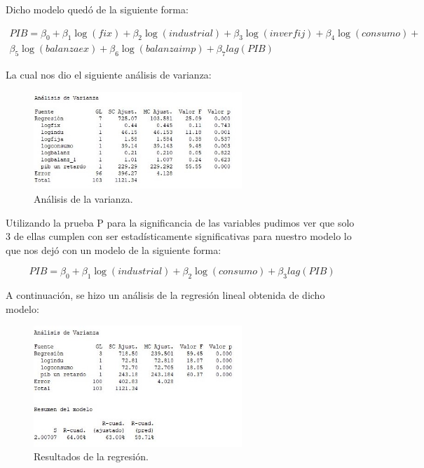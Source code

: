 \documentclass[a4paper]{article}
\begin{document}
Dicho modelo quedó de la siguiente forma:

\begin{eqnarray}
PIB = \beta_0 + \beta_1 \log(fix) + \beta_2 \log(industrial) + \beta_3 \log(inverfij) + \beta_4 \log(consumo) + \nonumber\\
\beta_5 \log(balanzaex) + \beta_6 \log(balanzaimp) + \beta_7 lag(PIB)
\end{eqnarray}

La cual nos dio el siguiente análisis de varianza:
\newpage

\begin{figure}[h]
\centering
\includegraphics[width=0.7\textwidth]{8.jpg}
\caption{\label{fig:tesla}Análisis de la varianza.}
\end{figure}

Utilizando la prueba P para la significancia de las variables pudimos ver que solo 3 de ellas cumplen con ser estadísticamente significativas para nuestro modelo lo que nos dejó con un modelo de la siguiente forma:

\begin{equation}
    PIB = \beta_0 + \beta_1 \log(industrial) + \beta_2 \log(consumo) + \beta_3 lag(PIB) 
\end{equation}

A continuación, se hizo un análisis de la regresión lineal obtenida de dicho modelo:

\begin{figure}[h]
\centering
\includegraphics[width=0.7\textwidth]{9.jpg}
\caption{\label{fig:tesla}Resultados de la regresión.}
\end{figure}
\end{document}
